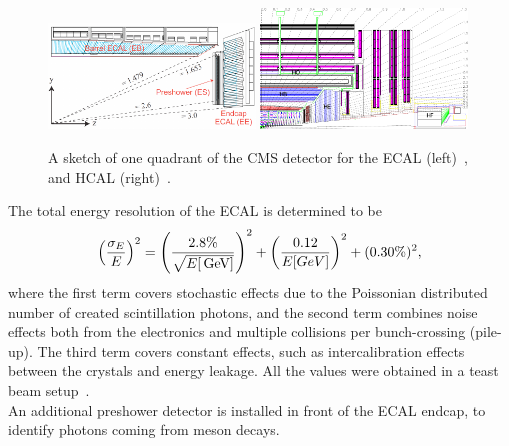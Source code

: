 \begin{figure}[tbp]
 \centering
 \includegraphics[width=0.49\textwidth]{figures/general/ecal}
 \includegraphics[width=0.49\textwidth]{figures/general/hcal}
 \caption{A sketch of one quadrant of the CMS detector for the ECAL (left)~\cite{ECALPicture}, and HCAL (right)~\cite{CMS}.}
 \label{fig:etaPlaneCMS}
\end{figure}
The total energy resolution of the ECAL is determined to be
\begin{equation}
 \left(\frac{\sigma_E}{E}\right)^2=\left(\frac{2.8\%}{\sqrt{E[\,\text{Ge\hspace{-.08em}V}]}}\right)^2 + \left(\frac{0.12}{E[GeV]}\right)^2 + (0.30\%)^2,
\end{equation}
where the first term covers stochastic effects due to the Poissonian distributed number of created scintillation photons, and the second term combines noise effects both from the electronics and multiple collisions per bunch-crossing (pile-up). The third term covers constant effects, such as intercalibration effects between the crystals and energy leakage. All the values were obtained in a teast beam setup~\cite{ECALRes}.\\
An additional preshower detector is installed in front of the ECAL endcap, to identify photons coming from meson decays.

